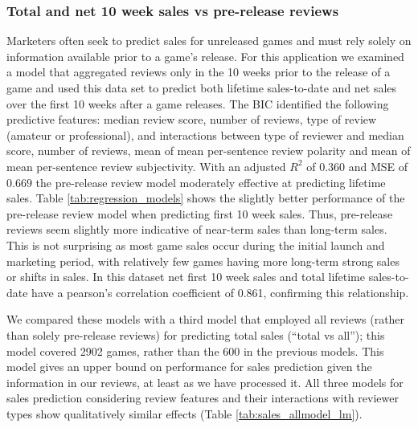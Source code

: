 \documentclass[letterpaper]{article}
\begin{document}
\subsubsection{Total and net 10 week sales vs pre-release reviews}
Marketers often seek to predict sales for unreleased games and must rely solely on information available prior to a game's release. For this application we examined a model that aggregated reviews only in the 10 weeks prior to the release of a game and used this data set to predict both lifetime sales-to-date and net sales over the first 10 weeks after a game releases.
The BIC identified the following predictive features: median review score, number of reviews, type of review (amateur or professional), and interactions between type of reviewer and median score, number of reviews, mean of mean per-sentence review polarity and mean of mean per-sentence review subjectivity.
With an adjusted $R^2$ of $0.360$ and MSE of $0.669$ the pre-release review model moderately effective at predicting lifetime sales. Table \ref{tab:regression_models} shows the slightly better performance of the pre-release review model when predicting first 10 week sales. Thus, pre-release reviews seem slightly more indicative of near-term sales than long-term sales. This is not surprising as most game sales occur during the initial launch and marketing period, with relatively few games having more long-term strong sales or shifts in sales. In this dataset net first 10 week sales and total lifetime sales-to-date have a pearson's correlation coefficient of 0.861, confirming this relationship.

We compared these models with a third model that employed all reviews (rather than solely pre-release reviews) for predicting total sales (``total vs all''); this model covered 2902 games, rather than the 600 in the previous models. This model gives an upper bound on performance for sales prediction given the information in our reviews, at least as we have processed it. All three models for sales prediction considering review features and their interactions with reviewer types show qualitatively similar effects (Table \ref{tab:sales_allmodel_lm}). 
\end{document}
